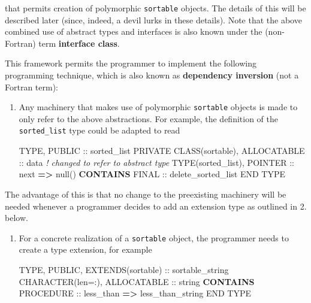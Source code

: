 \documentclass[
  paper=a4,
  ,captions=tableheading
]{scrartcl}
\newenvironment{Shaded}{\begin{snugshade}}{\end{snugshade}}
\newcommand{\CommentTok}[1]{\textcolor[rgb]{0.56,0.35,0.01}{\textit{#1}}}
\newcommand{\DataTypeTok}[1]{\textcolor[rgb]{0.13,0.29,0.53}{#1}}
\newcommand{\KeywordTok}[1]{\textcolor[rgb]{0.13,0.29,0.53}{\textbf{#1}}}
\newcommand{\NormalTok}[1]{#1}
\newcommand{\OperatorTok}[1]{\textcolor[rgb]{0.81,0.36,0.00}{\textbf{#1}}}
\begin{document}
that permits creation of polymorphic \texttt{sortable} objects. The
details of this will be described later (since, indeed, a devil lurks in
these details). Note that the above combined use of abstract types and
interfaces is also known under the (non-Fortran) term \textbf{interface
class}.

This framework permits the programmer to implement the following
programming technique, which is also known as \textbf{dependency
inversion} (not a Fortran term):

\begin{enumerate}
\def\labelenumi{\arabic{enumi}.}
\item
  Any machinery that makes use of polymorphic \texttt{sortable} objects
  is made to only refer to the above abstractions. For example, the
  definition of the \texttt{sorted\_list} type could be adapted to read

\begin{Shaded}
\begin{Highlighting}[]
\DataTypeTok{TYPE}\NormalTok{, }\DataTypeTok{PUBLIC} \DataTypeTok{::}\NormalTok{ sorted\_list}
   \DataTypeTok{PRIVATE}
   \DataTypeTok{CLASS(sortable)}\NormalTok{, }\DataTypeTok{ALLOCATABLE} \DataTypeTok{::}\NormalTok{ data}
   \CommentTok{! changed to refer to abstract type}
   \DataTypeTok{TYPE(sorted\_list)}\NormalTok{, }\DataTypeTok{POINTER} \DataTypeTok{::}\NormalTok{ next }\KeywordTok{=}\OperatorTok{\textgreater{}}\NormalTok{ null()}
\KeywordTok{CONTAINS}
   \DataTypeTok{FINAL} \DataTypeTok{::}\NormalTok{ delete\_sorted\_list}
\DataTypeTok{END TYPE}
\end{Highlighting}
\end{Shaded}
\end{enumerate}

The advantage of this is that no change to the preexisting machinery
will be needed whenever a programmer decides to add an extension type as
outlined in 2. below.

\begin{enumerate}
\def\labelenumi{\arabic{enumi}.}
\setcounter{enumi}{1}
\item
  For a concrete realization of a \texttt{sortable} object, the
  programmer needs to create a type extension, for example

\begin{Shaded}
\begin{Highlighting}[]
\DataTypeTok{TYPE}\NormalTok{, }\DataTypeTok{PUBLIC}\NormalTok{, }\DataTypeTok{EXTENDS(sortable)} \DataTypeTok{::}\NormalTok{ sortable\_string}
   \DataTypeTok{CHARACTER(len=:)}\NormalTok{, }\DataTypeTok{ALLOCATABLE} \DataTypeTok{::}\NormalTok{ string}
\KeywordTok{CONTAINS}
   \DataTypeTok{PROCEDURE} \DataTypeTok{::}\NormalTok{ less\_than }\KeywordTok{=}\OperatorTok{\textgreater{}}\NormalTok{ less\_than\_string}
\DataTypeTok{END TYPE}
\end{Highlighting}
\end{Shaded}
\end{enumerate}
\end{document}

